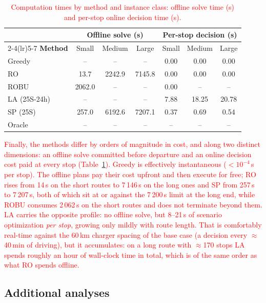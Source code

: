 \documentclass[preprint,12pt,3p]{elsarticle}
\newcommand{\red}[1]{\textcolor{red}{#1}}
\newcommand{\blue}[1]{{\color{darkblue}#1}}
\begin{document}
\begin{table}[htbp]
\centering
\caption{\red{Computation times by method and instance class: offline solve time (s) and per-stop online decision time (s).}}
\label{tab:runtime}
\begin{tabular}{lcccccc}
\toprule
& \multicolumn{3}{c}{\textbf{Offline solve (s)}} & \multicolumn{3}{c}{\textbf{Per-stop decision (s)}}\\
\cmidrule(lr){2-4}\cmidrule(lr){5-7}
\textbf{Method} & Small & Medium & Large & Small & Medium & Large\\
\midrule
Greedy & -- & -- & -- & 0.00 & 0.00 & 0.00 \\
RO & 13.7 & 2242.9 & 7145.8 & 0.00 & 0.00 & 0.00 \\
ROBU & 2062.0 & \blue{--} & \blue{--} & 0.00 & \blue{--} & \blue{--} \\
LA (25S-24h) & -- & -- & -- & 7.88 & 18.25 & 20.78 \\
SP (25S) & 257.0 & 6192.6 & 7207.1 & 0.37 & 0.69 & 0.54 \\
Oracle & -- & -- & -- & -- & -- & -- \\
\bottomrule
\end{tabular}
\end{table}


\red{Finally, the methods differ by orders of magnitude in cost, and along two
distinct dimensions: an offline solve committed before departure and an online
decision cost paid at every stop (Table~\ref{tab:runtime}). Greedy is
effectively instantaneous ($<10^{-4}$\,s per stop). The offline plans pay their
cost upfront and then execute for free; RO rises from 14\,s on the short routes
to 7\,146\,s on the long ones and SP from 257\,s to 7\,207\,s, both of which sit
at or against the 7\,200\,s limit at the long end, while ROBU consumes 2\,062\,s
on the short routes and does not terminate beyond them. LA carries the opposite
profile: no offline solve, but 8--21\,s of scenario optimization \emph{per stop},
growing only mildly with route length. That is comfortably real-time against the
60\,km charger spacing of the base case (a decision every $\approx$40\,min of
driving), but it accumulates: on a long route with $\approx$170 stops LA spends
roughly an hour of wall-clock time in total, which is of the same order as what
RO spends offline.}



\subsection{Additional analyses}
\label{sec:additional-protocol}
\end{document}
